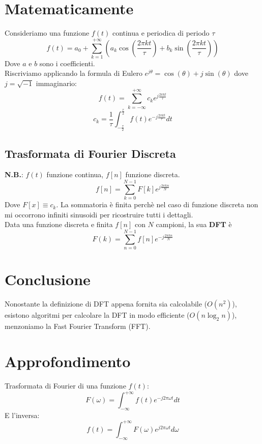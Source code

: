 \documentclass[12pt, a4paper]{report}
\begin{document}
\section{Matematicamente}
Consideriamo una funzione $f(t)$ continua e periodica di periodo $\tau$
\begin{equation*}
    f(t) = a_{0} + \sum_{k=1}^{+\infty} \left(a_{k} \cos\left(\frac{2\pi k t}{\tau}\right) + b_{k} \sin\left(\frac{2\pi k t}{\tau}\right)\right)
\end{equation*}
Dove $a$ e $b$ sono i coefficienti.\\
Riscriviamo applicando la formula di Eulero $e^{j\theta} = \cos(\theta) + j\sin(\theta)$ dove $j = \sqrt{-1}$ immaginario:
\begin{equation*}
    f(t) = \sum_{k=-\infty}^{+\infty} c_{k} e^{j\frac{2\pi k t}{\tau}}
\end{equation*}
\begin{equation*}
    c_{k} = \frac{1}{\tau} \int_{-\frac{\tau}{2}}^{\frac{\tau}{2}} f(t) e^{-j\frac{2\pi k t}{\tau}} dt
\end{equation*}
\subsection{Trasformata di Fourier Discreta}
\textbf{N.B.}: $f(t)$ funzione continua, $f[n]$ funzione discreta.
\begin{equation*}
    f[n] = \sum_{k=0}^{N-1} F[k] e^{j\frac{2\pi k n}{N}}
\end{equation*}
Dove $F[x]\equiv c_{k}$. La sommatoria è finita perchè nel caso di funzione discreta non mi occorrono infiniti sinusoidi per ricostruire tutti i dettagli.\\
Data una funzione discreta e finita $f[n]$ con $N$ campioni, la sua \textbf{DFT} è
\begin{equation*}
    F(k) = \sum_{n=0}^{N-1} f[n] e^{-j\frac{2\pi k n}{N}}
\end{equation*}
\section{Conclusione}
Nonostante la definizione di DFT appena fornita sia calcolabile ($O(n^{2})$), esistono algoritmi per calcolare la DFT in modo efficiente ($O(n\log_{2}n)$), menzoniamo la Fast Fourier Transform (FFT).
\section{Approfondimento}
Trasformata di Fourier di una funzione $f(t)$:
\begin{equation*}
    F(\omega) = \int_{-\infty}^{+\infty} f(t) e^{-j2\pi\omega t} dt
\end{equation*}
E l'inversa:
\begin{equation*}
    f(t) = \int_{-\infty}^{+\infty} F(\omega) e^{j2\pi\omega t} d\omega
\end{equation*}
\end{document}
